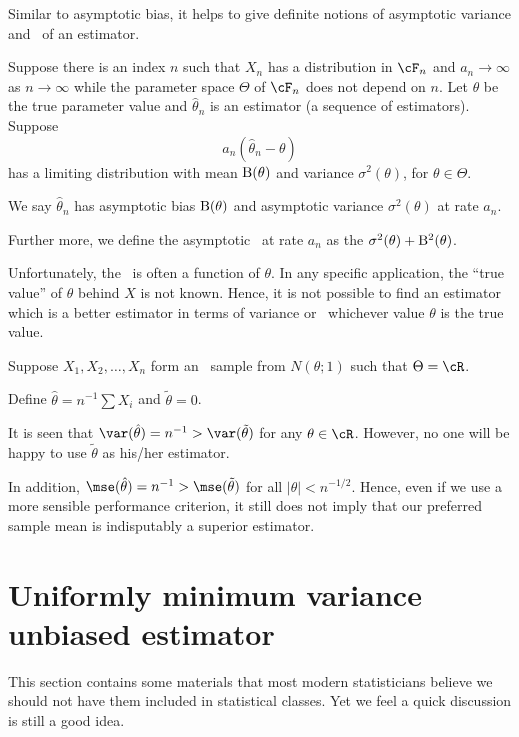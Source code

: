 Similar to asymptotic bias, it helps to give definite notions of
asymptotic variance and \mse\ of an estimator.

\begin{defi}
Suppose there is an index $n$ such that $X_n$ has a distribution
in $\cF_n$ and $a_n \to \infty$ as $n \to \infty$ while the parameter
space $\Theta$ of $\cF_n$ does not depend on $n$. Let $\theta$
be the true parameter value and $\hat \theta_n$ is an estimator
(a sequence of estimators).
Suppose
\[
a_n(\hat \theta_n - \theta)
\]
has a limiting distribution with mean ${\rm B}(\theta)$
and variance $\sigma^2(\theta)$, for $\theta \in \Theta$.

We say $\hat \theta_n$ has asymptotic bias ${\rm B}(\theta)$
and asymptotic variance $\sigma^2(\theta)$ at
rate $a_n$.

Further more, we define the asymptotic \mse\ at rate $a_n$ as
the $\sigma^2(\theta) + {\rm B}^2(\theta)$.
\end{defi}

Unfortunately, the \mse\ is often a function of $\theta$. In any
specific application, the ``true value'' of $\theta$ behind $X$
is not known. Hence, it is not possible to find an estimator
which is a better estimator in terms of variance or \mse\
whichever value $\theta$ is the true value.

\begin{example}
Suppose $X_1, X_2, \ldots, X_n$ form an \iid\ sample from
$N(\theta; 1)$ such that $\Theta = \cR$. 

Define $\hat \theta = n^{-1} \sum X_i$ and $\tilde \theta = 0$.

It is seen that $\var (\hat \theta) = n^{-1} > \var(\tilde \theta)$ for any
$\theta \in \cR$. However, no one will be happy to use $\tilde \theta$
as his/her estimator.

In addition, $\mse (\hat \theta) = n^{-1} > \mse (\tilde \theta)$
for all $|\theta| < n^{-1/2}$. Hence, even if we use a more sensible
performance criterion, it still does not imply that our preferred sample
mean is indisputably a superior estimator.
\end{example}

\section{Uniformly minimum variance unbiased estimator}

This section contains some materials that most modern statisticians
believe we should not have them included in statistical classes.
Yet we feel a quick discussion is still a good idea.

